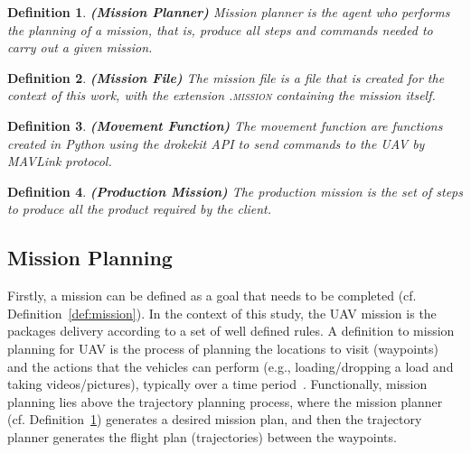 \documentclass[conference,harvard,brazil,english]{sbatex}
\newtheorem{myDefinition}{Definition}
\begin{document}
\begin{myDefinition}
\textbf{(Mission Planner)}
Mission planner is the agent who performs the planning of a mission, that is, produce all steps and commands needed to carry out a given mission.
\label{def:planejadorMissao}
\end{myDefinition}

\begin{myDefinition}
 \textbf{(Mission File)}
The mission file is a file that is created for the context of this work, with the extension \textsc{.mission} containing the mission itself.
\label{def:arquivoMissao}
\end{myDefinition}

\begin{myDefinition}
 \textbf{(Movement Function)}
The movement function are functions created in Python using the drokekit API to send commands to the UAV by MAVLink protocol.
\label{def:movFunc}
\end{myDefinition}

\begin{myDefinition}
 \textbf{(Production Mission)}
The production mission is the set of steps to produce all the product required by the client.
\label{def:prodMission}
\end{myDefinition}


\subsection{Mission Planning}
\label{subsec:missionplanning}

Firstly, a mission can be defined as a goal that needs to be completed (cf. Definition~\ref{def:mission}). In the context of this study, the UAV mission is the packages delivery according to a set of well defined rules. A definition to mission planning for UAV is the process of planning the locations to visit (waypoints) and the actions that the vehicles can perform (e.g., loading/dropping a load and taking videos/pictures), typically over a time period~\cite{ramirez2014solving}. Functionally, mission planning lies above the trajectory planning process, where the mission planner (cf. Definition~\ref{def:planejadorMissao}) generates a desired mission plan, and then the trajectory planner generates the flight plan (trajectories) between the waypoints.

\end{document}
